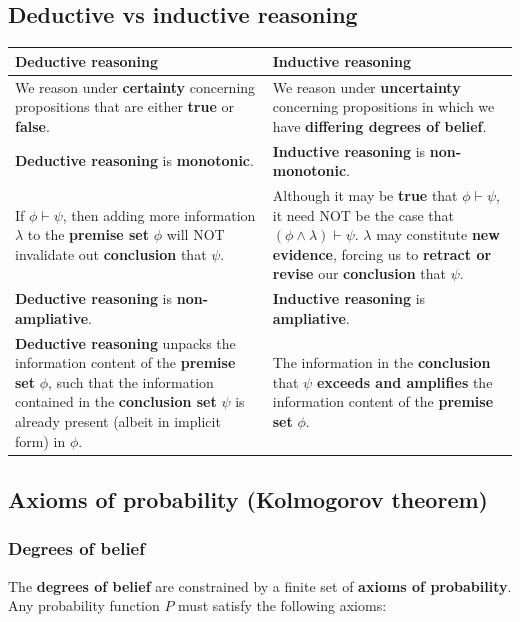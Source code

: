 \documentclass[11pt]{article}
\begin{document}
\subsection{Deductive vs inductive reasoning}
\label{sec:orgca5afea}
\begin{center}
\begin{tabularx}{\textwidth}{|X|X|}
\hline
Deductive reasoning & Inductive reasoning\\
\hline
We reason under \textbf{certainty} concerning propositions that are either \textbf{true} or \textbf{false}. & We reason under \textbf{uncertainty} concerning propositions in which we have \textbf{differing degrees of belief}.\\
\hline
\textbf{Deductive reasoning} is \textbf{monotonic}. & \textbf{Inductive reasoning} is \textbf{non-monotonic}.\\
If \(\phi \vdash \psi\), then adding more information \(\lambda\) to the \textbf{premise set} \(\phi\) will NOT invalidate out \textbf{conclusion} that \(\psi\). & Although it may be \textbf{true} that \(\phi \vdash \psi\), it need NOT be the case that \((\phi \wedge \lambda) \vdash \psi\). \(\lambda\) may constitute \textbf{new evidence}, forcing us to \textbf{retract or revise} our \textbf{conclusion} that \(\psi\).\\
\hline
\textbf{Deductive reasoning} is \textbf{non-ampliative}. & \textbf{Inductive reasoning} is \textbf{ampliative}.\\
\textbf{Deductive reasoning} unpacks the information content of the \textbf{premise set} \(\phi\), such that the information contained in the \textbf{conclusion set} \(\psi\) is already present (albeit in implicit form) in \(\phi\). & The information in the \textbf{conclusion} that \(\psi\) \textbf{exceeds and amplifies} the information content of the \textbf{premise set} \(\phi\).\\
\hline
\end{tabularx}
\end{center}
 \newpage
\subsection{Axioms of probability (Kolmogorov theorem)}
\label{sec:org0c0fcbd}

\subsubsection{Degrees of belief}
\label{sec:org313e98e}
The \textbf{degrees of belief} are constrained by a finite set of \textbf{axioms of probability}. Any probability function \(P\) must satisfy the following axioms:
\end{document}
